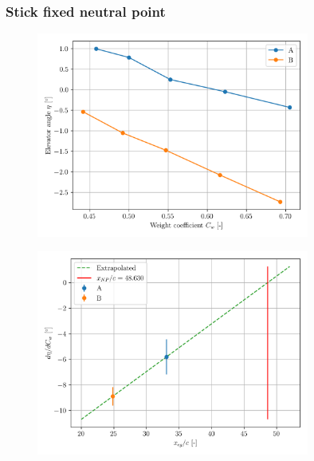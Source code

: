 \documentclass{article}
\begin{document}
\subsubsection{Stick fixed neutral point}

\begin{figure}[H]
    \centering
    \includegraphics[width=0.8\textwidth]{Longitudinal_Static_Stability_1.png}
    \caption{}
    \label{fig:Longitudinal_Static_Stability_1}
\end{figure}
\begin{figure}[H]
    \centering
    \includegraphics[width=0.8\textwidth]{Longitudinal_Static_Stability_2.png}
    \caption{}
    \label{fig:Longitudinal_Static_Stability_2}
\end{figure}
\end{document}
